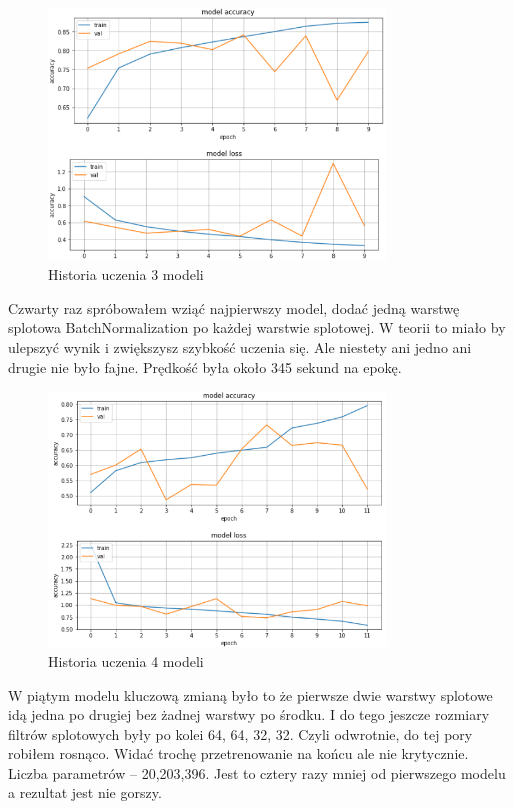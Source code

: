 \documentclass{article}
\begin{document}
\begin{figure}[H]
	\centering
	\includegraphics[width=0.8\textwidth,keepaspectratio=true]{history_3}
	\caption{Historia uczenia 3 modeli}
	\label{history_3}
\end{figure}

Czwarty raz spróbowałem wziąć najpierwszy model, dodać jedną warstwę splotowa  BatchNormalization po każdej warstwie splotowej. W teorii to miało by ulepszyć wynik i zwiększysz szybkość uczenia się. Ale niestety ani jedno ani drugie nie było fajne. Prędkość była około 345 sekund na epokę.

\begin{figure}[H]
	\centering
	\includegraphics[width=0.8\textwidth,keepaspectratio=true]{history_4}
	\caption{Historia uczenia 4 modeli}
	\label{history_4}
\end{figure}

W piątym modelu kluczową zmianą było to że pierwsze dwie warstwy splotowe idą jedna po drugiej bez żadnej warstwy po środku. I do tego jeszcze rozmiary filtrów splotowych były po kolei 64, 64, 32, 32. Czyli odwrotnie, do tej pory robiłem rosnąco. Widać trochę przetrenowanie na końcu ale nie krytycznie. Liczba parametrów -- 20,203,396. Jest to cztery razy mniej od pierwszego modelu a rezultat jest nie gorszy.
\end{document}
